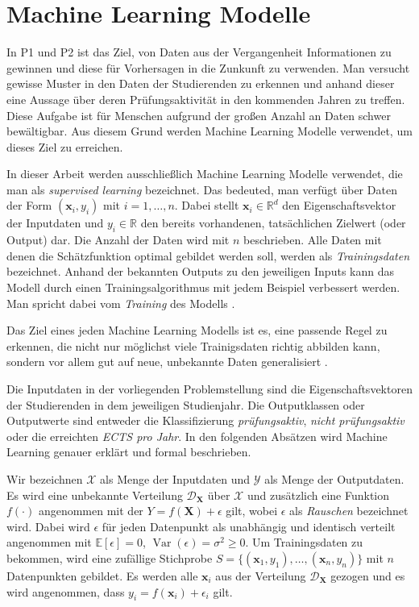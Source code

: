 

\section{Machine Learning Modelle}
\label{sec:ml}

In P1 und P2 ist das Ziel, von Daten aus der Vergangenheit Informationen zu gewinnen und diese f\"ur Vorhersagen in die Zunkunft zu verwenden.
Man versucht gewisse Muster in den Daten der Studierenden zu erkennen und anhand dieser eine Aussage \"uber deren Pr\"ufungsaktivit\"at in den kommenden Jahren zu treffen.
Diese Aufgabe ist f\"ur Menschen aufgrund der gro{\ss}en Anzahl an Daten schwer bew\"altigbar. Aus diesem Grund werden Machine Learning Modelle verwendet,
um dieses Ziel zu erreichen.

In dieser Arbeit werden ausschlie{\ss}lich Machine Learning Modelle verwendet, die man als \textit{supervised learning} bezeichnet.
Das bedeuted, man verf\"ugt \"uber Daten der Form $(\mathbf{x}_i, y_i)$ mit $i = 1,\dots,n$. Dabei stellt $\mathbf{x}_i \in \mathbb{R}^d$ den Eigenschaftsvektor
der Inputdaten und $y_i \in \mathbb{R}$ den bereits vorhandenen, tats\"achlichen Zielwert (oder Output) dar. Die Anzahl der Daten wird mit $n$ beschrieben. Alle Daten mit denen die
Sch\"atzfunktion optimal gebildet werden soll, werden als \textit{Trainingsdaten} bezeichnet.
Anhand der bekannten Outputs zu den jeweiligen Inputs kann das Modell durch einen Trainingsalgorithmus mit jedem Beispiel verbessert werden.
Man spricht dabei vom \textit{Training} des Modells \cite[Seiten 19 bis 25]{shalev}.

Das Ziel eines jeden Machine Learning Modells ist es, eine passende Regel zu erkennen, die nicht nur m\"oglichst viele Trainigsdaten richtig abbilden kann, sondern vor allem
gut auf neue, unbekannte Daten generalisiert \cite[Seite 371]{strang}. 

Die Inputdaten in der vorliegenden Problemstellung sind die Eigenschaftsvektoren der Studierenden in dem jeweiligen Studienjahr. Die Outputklassen oder
Outputwerte sind entweder die Klassifizierung \textit{pr\"ufungsaktiv}, \textit{nicht pr\"ufungsaktiv} oder die erreichten \textit{ECTS pro Jahr}.
In den folgenden Abs\"atzen wird Machine Learning genauer erkl\"art und formal beschrieben.

Wir bezeichnen $\mathcal{X}$ als Menge der Inputdaten und $\mathcal{Y}$ als Menge der Outputdaten. Es wird eine unbekannte Verteilung $\mathcal{D}_{\mathbf{X}}$ \"uber
$\mathcal{X}$ und zus\"atzlich eine Funktion $f(\cdot)$ angenommen mit der $Y = f(\mathbf{X}) + \epsilon$ gilt, wobei $\epsilon$ als \textit{Rauschen} bezeichnet wird.
Dabei wird $\epsilon$ f\"ur jeden Datenpunkt als unabh\"angig und identisch verteilt angenommen mit
$\mathbb{E}[\epsilon] = 0$, $\operatorname{Var}(\epsilon) = \sigma^2 \geq 0$.
Um Trainingsdaten zu bekommen, wird eine zuf\"allige Stichprobe $S = \{(\mathbf{x}_1, y_1), \dots ,
	(\mathbf{x}_n, y_n)\}$ mit $n$ Datenpunkten gebildet. Es werden alle $\mathbf{x}_i$ aus der Verteilung $\mathcal{D}_\mathbf{X}$ gezogen und es wird
angenommen, dass $y_i = f(\mathbf{x}_i) + \epsilon_i $ gilt.

